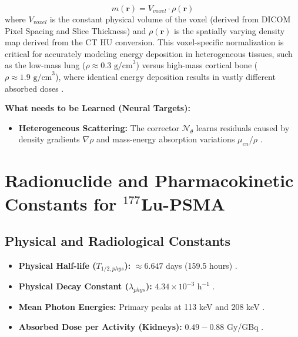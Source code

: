 \documentclass[11pt,a4paper]{article}
\begin{document}
\begin{itemize}
    \begin{equation}
        m(\mathbf{r}) = V_{voxel} \cdot \rho(\mathbf{r})
    \end{equation}
    where $V_{voxel}$ is the constant physical volume of the voxel (derived from DICOM Pixel Spacing and Slice Thickness) and $\rho(\mathbf{r})$ is the spatially varying density map derived from the CT HU conversion. This voxel-specific normalization is critical for accurately modeling energy deposition in heterogeneous tissues, such as the low-mass lung ($ \rho \approx 0.3 \text{ g/cm}^3$) versus high-mass cortical bone ($\rho \approx 1.9 \text{ g/cm}^3$), where identical energy deposition results in vastly different absorbed doses \cite{GtzSchmidkonz2019, StabinMadsen2019}.
\end{itemize}

\textbf{What needs to be Learned (Neural Targets):}
\begin{itemize}
    \item \textbf{Heterogeneous Scattering:} The corrector $\mathcal{N}_\theta$ learns residuals caused by density gradients $\nabla \rho$ and mass-energy absorption variations $\mu_{en}/\rho$ \cite{BaileyMarquis2022, MikellKappadath2016}.
\end{itemize}

\section{Radionuclide and Pharmacokinetic Constants for $^{177}$Lu-PSMA}

\subsection{Physical and Radiological Constants}
\begin{itemize}
    \item \textbf{Physical Half-life ($T_{1/2,phys}$):} $\approx 6.647$ days (159.5 hours) \cite{HardiansyahYousefzadehNowshahr2024}.
    \item \textbf{Physical Decay Constant ($\lambda_{phys}$):} $4.34 \times 10^{-3} \text{ h}^{-1}$ \cite{ReschFouladgar2023}.
    \item \textbf{Mean Photon Energies:} Primary peaks at 113 keV and 208 keV \cite{StabinMadsen2019}.
    \item \textbf{Absorbed Dose per Activity (Kidneys):} $0.49 - 0.88$ Gy/GBq \cite{ChuamsaamarkkeeCharoenphun2025, OkamotoThieme2016}.
\end{itemize}
\end{document}
